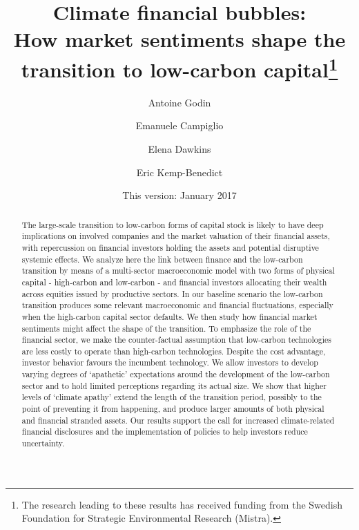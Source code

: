 \documentclass[authoryear]{article}
\begin{document}
 

\title{Climate financial bubbles: \\How market sentiments shape the transition to low-carbon capital\footnote{The research leading to these results has received funding from the Swedish Foundation for Strategic Environmental Research (Mistra).}}
\author[1]{Antoine Godin}
\author[2]{Emanuele Campiglio}
\author[3]{Elena Dawkins}
\author[3]{Eric Kemp-Benedict}
\renewcommand\Authands{ and }

\date{This version: January 2017}

\maketitle

\vspace{-0.7cm}
\begin{abstract}
The large-scale transition to low-carbon forms of capital stock is likely to have deep implications on involved companies and the market valuation of their financial assets, with repercussion on financial investors holding the assets and potential disruptive systemic effects. We analyze here the link between finance and the low-carbon transition by means of a multi-sector macroeconomic model with two forms of physical capital - high-carbon and low-carbon - and financial investors allocating their wealth across equities issued by productive sectors. In our baseline scenario the low-carbon transition produces some relevant macroeconomic and financial fluctuations, especially when the high-carbon capital sector defaults. We then study how financial market sentiments might affect the shape of the transition. To emphasize the role of the financial sector, we make the counter-factual assumption that low-carbon technologies are less costly to operate than high-carbon technologies. Despite the cost advantage, investor behavior favours the incumbent technology. We allow investors to develop varying degrees of `apathetic' expectations around the development of the low-carbon sector and to hold limited perceptions regarding its actual size. We show that higher levels of `climate apathy' extend the length of the transition period, possibly to the point of preventing it from happening, and produce larger amounts of both physical and financial stranded assets. Our results support the call for increased climate-related financial disclosures and the implementation of policies to help investors reduce uncertainty.

\end{abstract}
\end{document}
